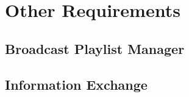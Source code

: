 \KNEADSECTIONNEWPAGE
\section{Other Requirements}
\label{lab:sec_OtherRequirements}
% 

\subsection{Broadcast Playlist Manager}
\label{loc:ssec_Playlist}


\subsection{Information Exchange}
\label{loc:ssec_InfoExchange}
